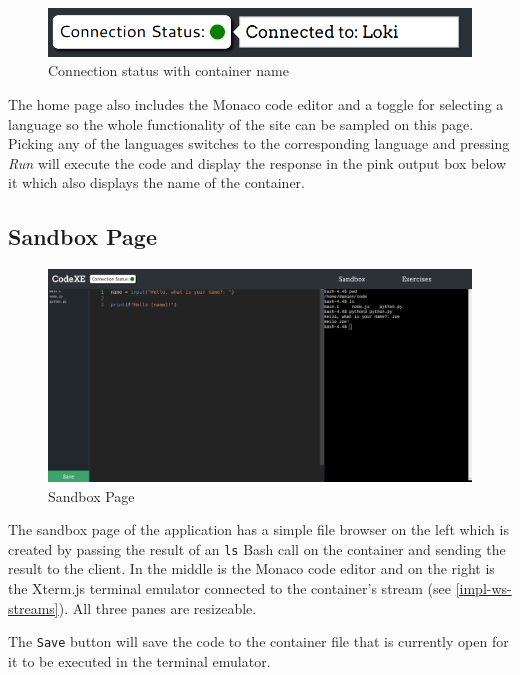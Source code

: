 \begin{figure}[h!]
    \centering
    \includegraphics[width=\linewidth]{res/connection_status_with_popout.png}
    \caption{Connection status with container name}
    \label{fig:connection-popout}
\end{figure}

The home page also includes the Monaco code editor and a toggle for selecting a language so the whole functionality of the site can be sampled on this page. Picking any of the languages switches to the corresponding language and pressing \textit{Run} will execute the code and display the response in the pink output box below it which also displays the name of the container.

\subsection{Sandbox Page} \label{impl-sandbox-page}

\begin{figure}[h!]
    \centering
    \includegraphics[width=\linewidth]{res/sandbox_page.png}
    \caption{Sandbox Page}
    \label{fig:sandboxpage}
\end{figure}

The sandbox page of the application has a simple file browser on the left which is created by passing the result of an \texttt{ls} Bash call on the container and sending the result to the client. In the middle is the Monaco code editor and on the right is the Xterm.js terminal emulator connected to the container's stream (see \ref{impl-ws-streams}). All three panes are resizeable.

The \texttt{Save} button will save the code to the container file that is currently open for it to be executed in the terminal emulator.


